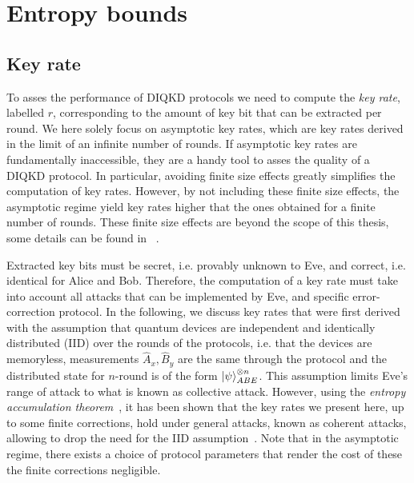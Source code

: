 \chapter{Entropy bounds}
\label{chap:entropybound}

\section{Key rate}

To asses the performance of DIQKD protocols we need to compute the \textit{key rate}, labelled $r$, corresponding to the amount of key bit that can be extracted per round.
We here solely focus on asymptotic key rates, which are key rates derived in the limit of an infinite number of rounds.
If asymptotic key rates are fundamentally inaccessible, they are a handy tool to asses the quality of a DIQKD protocol.
In particular, avoiding finite size effects greatly simplifies the computation of key rates.
However, by not including these finite size effects, the asymptotic regime yield key rates higher that the ones obtained for a finite number of rounds.
These finite size effects are beyond the scope of this thesis, some details can be found in ~\cite{Tan2021,Tan2022,Primaatmaja2023}.

Extracted key bits must be secret, i.e. provably unknown to Eve, and correct, i.e. identical for Alice and Bob.
Therefore, the computation of a key rate must take into account all attacks that can be implemented by Eve, and specific error-correction protocol.
In the following, we discuss key rates that were first derived with the assumption that quantum devices are independent and identically distributed (IID) over the rounds of the protocols, i.e. that the devices are memoryless, measurements $\hat{A}_x,\hat{B}_y$ are the same through the protocol and the distributed state for $n$-round is of the form $\ket{\psi}_{ABE}^{\otimes n}$.
This assumption limits Eve's range of attack to what is known as collective attack.
However, using the \textit{entropy accumulation theorem}~\cite{Dupuis2019,Dupuis2020}, it has been shown that the key rates we present here, up to some finite corrections, hold under general attacks, known as coherent attacks, allowing to drop the need for the IID assumption~\cite{ArnonFriedman2019}.
Note that in the asymptotic regime, there exists a choice of protocol parameters that render the cost of these the finite corrections negligible.


\medbreak

